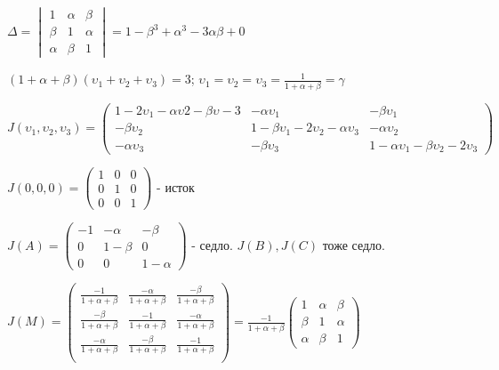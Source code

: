 \documentclass[oneside, final, 12pt]{article}
\begin{document}
\vspace{0.5cm}
\(
	\Delta = 
	\begin{vmatrix}
	1 & \alpha & \beta \\ 
	\beta & 1 & \alpha \\
	\alpha & \beta & 1
	\end{vmatrix}
	= 1 - \beta^3 + \alpha^3 - 3\alpha\beta + 0
\)

\vspace{0.5cm}
\((1 + \alpha + \beta)(\upsilon_1 + \upsilon_2 + \upsilon_3) = 3 \);\hspace{0.5cm}
\(\upsilon_1 = \upsilon_2 = \upsilon_3 = \frac{1}{1 + \alpha + \beta} = \gamma \)

\vspace{0.5cm}
\(
J (\upsilon_1,\upsilon_2,\upsilon_3) = 
	\begin{pmatrix}
		1 - 2\upsilon_1 - \alpha\upsilon2 - \beta\upsilon-3 & -\alpha\upsilon_1 & -\beta\upsilon_1 \\
		-\beta\upsilon_2 & 1 - \beta\upsilon_1 - 2\upsilon_2 - \alpha\upsilon_3 & -\alpha\upsilon_2\\
		-\alpha\upsilon_3 & -\beta\upsilon_3 & 1 - \alpha\upsilon_1 - \beta\upsilon_2 - 2\upsilon_3
	\end{pmatrix}
\)

\vspace{0.5cm}
\(
J(0,0,0) = 
	\begin{pmatrix}
		1 & 0 & 0\\
		0 & 1 & 0\\
		0 & 0 & 1
	\end{pmatrix}
\)
\hspace{0.2cm} - исток

\vspace{0.5cm}
\(
J(A) = 
	\begin{pmatrix}
	-1 & -\alpha & -\beta \\
	0  & 1-\beta & 0      \\
	0  &   0     & 1-\alpha
	\end{pmatrix}
\)
\hspace{0.2cm} - седло. \(J(B), J(C)\) тоже седло.

\vspace{0.5cm}
\begin{LARGE}
\(
J(M) =
	\begin{pmatrix}
		\frac{-1}{1+\alpha + \beta} & \frac{-\alpha}{1+\alpha+\beta} & \frac{-\beta}{1+\alpha+\beta}\\
		 \frac{-\beta}{1+\alpha+\beta} & \frac{-1}{1+\alpha + \beta} & \frac{-\alpha}{1+\alpha+\beta}\\
		 \frac{-\alpha}{1+\alpha+\beta} & \frac{-\beta}{1+\alpha+\beta} & \frac{-1}{1+\alpha + \beta}\\
	\end{pmatrix}
=\frac{-1}{1+\alpha+\beta}
	\begin{pmatrix}
		1 & \alpha & \beta\\
		\beta & 1 & \alpha\\
		\alpha & \beta & 1
	\end{pmatrix}
\)
\end{LARGE}
\end{document}

